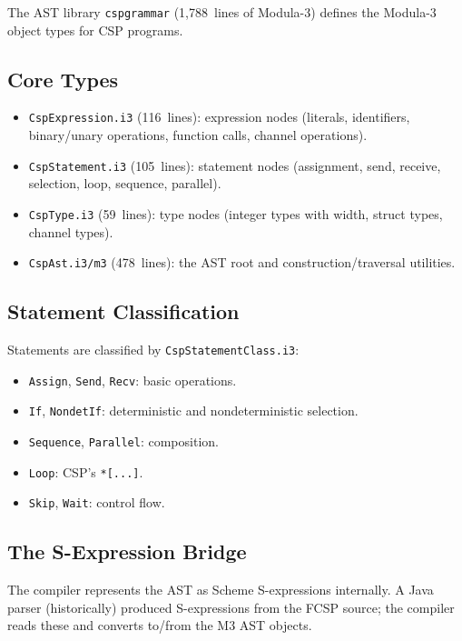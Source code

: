 \documentclass[11pt,letterpaper]{article}
\begin{document}
The AST library \texttt{cspgrammar} (1,788~lines of Modula-3)
defines the Modula-3 object types for CSP programs.

\subsection{Core Types}

\begin{itemize}[nosep]
  \item \texttt{CspExpression.i3} (116~lines): expression nodes
    (literals, identifiers, binary/unary operations, function calls,
    channel operations).
  \item \texttt{CspStatement.i3} (105~lines): statement nodes
    (assignment, send, receive, selection, loop, sequence, parallel).
  \item \texttt{CspType.i3} (59~lines): type nodes (integer types
    with width, struct types, channel types).
  \item \texttt{CspAst.i3/m3} (478~lines): the AST root and
    construction/traversal utilities.
\end{itemize}

\subsection{Statement Classification}

Statements are classified by \texttt{CspStatementClass.i3}:
\begin{itemize}[nosep]
  \item \texttt{Assign}, \texttt{Send}, \texttt{Recv}: basic operations.
  \item \texttt{If}, \texttt{NondetIf}: deterministic and nondeterministic
    selection.
  \item \texttt{Sequence}, \texttt{Parallel}: composition.
  \item \texttt{Loop}: CSP's \texttt{*[...]}.
  \item \texttt{Skip}, \texttt{Wait}: control flow.
\end{itemize}

\subsection{The S-Expression Bridge}

The compiler represents the AST as Scheme S-expressions internally.
A Java parser (historically) produced S-expressions from the FCSP
source; the compiler reads these and converts to/from the M3 AST
objects.
\end{document}
